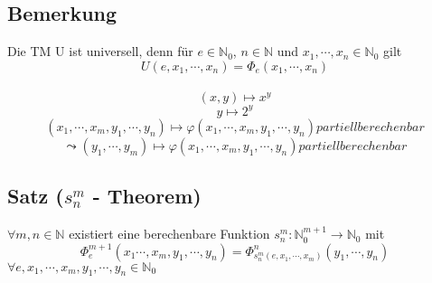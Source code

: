 \subsection{Bemerkung} \sloppy Die TM U ist universell, denn für $e \in \mathbb{N}_0$, $n \in \mathbb{N}$ und $x_1, \cdots, x_n \in \mathbb{N}_0$ gilt \[U(e,x_1, \cdots, x_n) = \Phi_e(x_1, \cdots, x_n)\]\\ \[(x, y) \mapsto x^y\] \[y \mapsto 2^y\] \[(x_1, \cdots, x_m, y_1, \cdots, y_n) \mapsto \varphi(x_1, \cdots, x_m, y_1, \cdots, y_n) partiell berechenbar\] \[\leadsto (y_1,\cdots, y_m) \mapsto \varphi(x_1, \cdots, x_m, y_1, \cdots, y_n) partiell berechenbar \]

\subsection{Satz ($s_n^m$ - Theorem)} $\forall m, n \in \mathbb{N}$ existiert eine berechenbare Funktion $s_n^m : \mathbb{N}_0^{m+1} \to \mathbb{N}_0$ mit \[\Phi_e^{m+1}(x_1\cdots, x_m, y_1, \cdots, y_n) = \Phi_{s_n^m(e, x_1, \cdots, x_m)}^n (y_1, \cdots, y_n)\] $\forall e, x_1, \cdots, x_m, y_1, \cdots, y_n \in \mathbb{N}_0$

